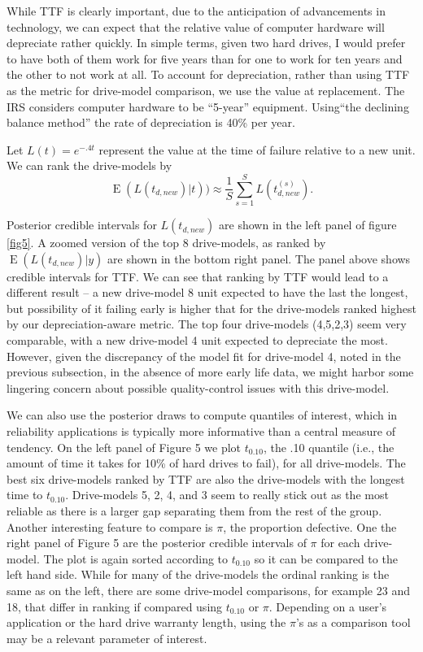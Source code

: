 \documentclass[12pt]{article}
\newcommand{\op}{\operatorname}
\begin{document}
While TTF is clearly important, due to the
anticipation of advancements in technology, we can expect that the
relative value of computer hardware will depreciate rather quickly. In simple terms, given two hard drives, I would prefer to have both of them work for five years than for one to work for ten years and the other to not work at all. To account
for depreciation, rather than using TTF as the metric for drive-model comparison, we use the value at replacement. The IRS considers
computer hardware to be ``5-year'' equipment\cite{f4562}. Using``the declining
balance method'' the rate of depreciation is 40\% per year.

Let $L(t) = e^{-.4t}$ represent the value at the time of failure
relative to a new unit. We can rank the drive-models by 
$$\op{E}(L(t_{d,new})|t))\approx \frac{1}{S} \sum_{s=1}^{S} L(t_{d,new}^{(s)}).$$

Posterior credible intervals for $L(t_{d,new})$ are shown in the left panel of figure \ref{fig5}. A zoomed version of the top 8 drive-models, as ranked by $\op{E}(L(t_{d,new})|y)$ are shown in the bottom right panel. The panel above shows credible intervals for TTF. We can see that ranking by TTF would lead to a different result -- a new drive-model 8 unit expected to have the last the longest, but possibility of it failing early is higher that for the drive-models ranked highest by our depreciation-aware metric. The top four drive-models (4,5,2,3) seem very comparable, with a new drive-model 4 unit expected to depreciate the most. However, given the discrepancy of the model fit for drive-model 4, noted in the previous subsection, in the absence of more early life data, we might harbor some lingering concern about possible quality-control issues with this drive-model.

We can also use the posterior draws to compute quantiles of interest, which in reliability applications is typically more informative than a central measure of tendency.  On the left panel of Figure 5 we plot $t_{0.10}$, the .10 quantile (i.e., the amount of time it takes for 10\% of hard drives to fail), for all drive-models. The best six drive-models ranked by TTF are also the drive-models with the longest time to $t_{0.10}$.  Drive-models 5, 2, 4, and 3 seem to really stick out as the most reliable as there is a larger gap separating them from the rest of the group.  Another interesting feature to compare is $\pi$, the proportion defective.  One the right panel of Figure 5 are the posterior credible intervals of $\pi$ for each drive-model.  The plot is again sorted according to $t_{0.10}$ so it can be compared to the left hand side.  While for many of the drive-models the ordinal ranking is the same as on the left, there are some drive-model comparisons, for example 23 and 18, that differ in ranking if compared using $t_{0.10}$ or $\pi$.  Depending on a user's application or the hard drive warranty length, using the $\pi$'s as a comparison tool may be a relevant parameter of interest.   
 
\end{document}
